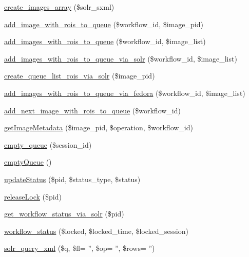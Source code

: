 \begin{DoxyCompactItemize}
\item 
\hyperlink{workspace_8functions_8php_adfcd9fab20ef467d28028fde721a99e8}{create\_\-images\_\-array} (\$solr\_\-sxml)
\item 
\hyperlink{workspace_8functions_8php_a024dcf99823d7692f81c247176d8e81c}{add\_\-image\_\-with\_\-rois\_\-to\_\-queue} (\$workflow\_\-id, \$image\_\-pid)
\item 
\hyperlink{workspace_8functions_8php_a4295d0f4ddc3d821000c2f27098995e0}{add\_\-images\_\-with\_\-rois\_\-to\_\-queue} (\$workflow\_\-id, \$image\_\-list)
\item 
\hyperlink{workspace_8functions_8php_a969f4513f3066aa70a74af9590a64f8f}{add\_\-images\_\-with\_\-rois\_\-to\_\-queue\_\-via\_\-solr} (\$workflow\_\-id, \$image\_\-list)
\item 
\hyperlink{workspace_8functions_8php_a92545a3b3fdf140f59288f377fb9e981}{create\_\-queue\_\-list\_\-rois\_\-via\_\-solr} (\$image\_\-pid)
\item 
\hyperlink{workspace_8functions_8php_a9c86489822e487e1438f143b4ebae17f}{add\_\-images\_\-with\_\-rois\_\-to\_\-queue\_\-via\_\-fedora} (\$workflow\_\-id, \$image\_\-list)
\item 
\hyperlink{workspace_8functions_8php_a9c4a73bd57f1024ddeae416b8013e961}{add\_\-next\_\-image\_\-with\_\-rois\_\-to\_\-queue} (\$workflow\_\-id)
\item 
\hyperlink{workspace_8functions_8php_a48e20dce520fdabf3c5e1f6de04d0393}{getImageMetadata} (\$image\_\-pid, \$operation, \$workflow\_\-id)
\item 
\hyperlink{workspace_8functions_8php_a391d88ccd1497a1380618928ab5e8e02}{empty\_\-queue} (\$session\_\-id)
\item 
\hyperlink{workspace_8functions_8php_adc8a7972c0fe59df9ebeb226c30c1fcf}{emptyQueue} ()
\item 
\hyperlink{workspace_8functions_8php_ab698518e69f8e41be92fc0e1576f69f6}{updateStatus} (\$pid, \$status\_\-type, \$status)
\item 
\hyperlink{workspace_8functions_8php_af009f86f57dec896f8c08dbccd931822}{releaseLock} (\$pid)
\item 
\hyperlink{workspace_8functions_8php_ae4bb84838e415581eb08082d9018478e}{get\_\-workflow\_\-status\_\-via\_\-solr} (\$pid)
\item 
\hyperlink{workspace_8functions_8php_a4fd3cbdcf1282bd92e9609b5de35863c}{workflow\_\-status} (\$locked, \$locked\_\-time, \$locked\_\-session)
\item 
\hyperlink{workspace_8functions_8php_ae6356bbdc7e39f2f56be2e74848e4c58}{solr\_\-query\_\-xml} (\$q, \$fl= '', \$op= '', \$rows= '')

\end{DoxyCompactItemize}
